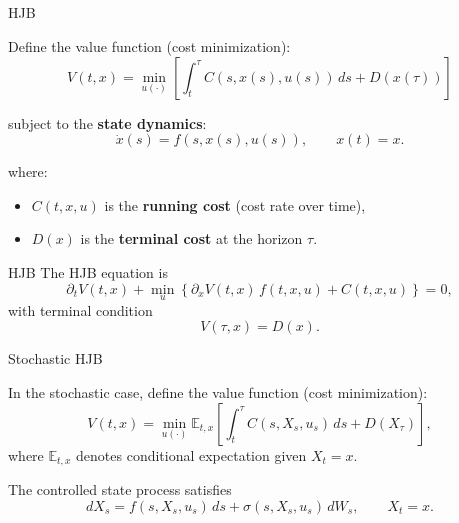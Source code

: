 \documentclass{beamer}
\theoremstyle{definition}
\newcommand{\E}{\mathbb{E}}
\begin{document}
\subsection{}

\begin{frame}{HJB}

Define the value function (cost minimization):
\begin{equation}
    V(t, x) = \min_{u(\cdot)}\left[\int_t^\tau C(s, x(s), u(s)) \, ds + D(x(\tau)) \right]
\end{equation}

subject to the \textbf{state dynamics}:
\begin{equation}
    \dot{x}(s) = f(s, x(s), u(s)), \qquad x(t) = x.
\end{equation}

where:
\begin{itemize}
    \item $C(t,x,u)$ is the \textbf{running cost} (cost rate over time),
    \item $D(x)$ is the \textbf{terminal cost} at the horizon $\tau$.
\end{itemize}

\end{frame}

\begin{frame}{HJB}
    The HJB equation is
    \begin{equation}
    \partial_t V(t,x)
    + \min_{u} \left\{
        \partial_x V(t,x)\, f(t,x,u)
        + C(t,x,u)
    \right\} = 0,
    \end{equation}
    with terminal condition
    \begin{equation}
        V(\tau,x) = D(x).
    \end{equation}
\end{frame}





\begin{frame}{Stochastic HJB}

In the stochastic case, define the value function (cost minimization):
\begin{equation}
    V(t,x) = \min_{u(\cdot)} \E_{t,x}\!\left[\int_t^\tau C(s, X_s, u_s) \, ds + D(X_\tau) \right],
\end{equation}
where \(\E_{t,x}\) denotes conditional expectation given \(X_t=x\).

The controlled state process satisfies
\begin{equation}
    dX_s = f(s, X_s, u_s)\,ds + \sigma(s, X_s, u_s)\,dW_s, \qquad X_t=x.
\end{equation}

\end{frame}
\end{document}
